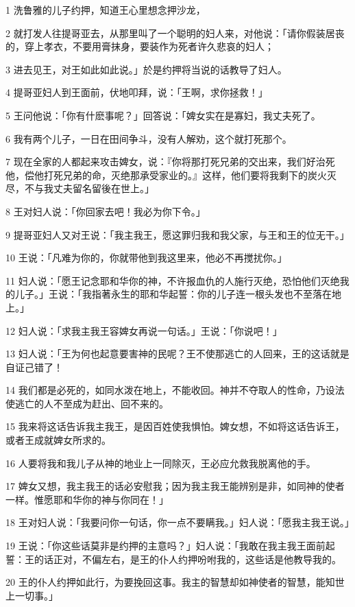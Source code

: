\par 1 洗鲁雅的儿子约押，知道王心里想念押沙龙，
\par 2 就打发人往提哥亚去，从那里叫了一个聪明的妇人来，对他说：「请你假装居丧的，穿上孝衣，不要用膏抹身，要装作为死者许久悲哀的妇人；
\par 3 进去见王，对王如此如此说。」於是约押将当说的话教导了妇人。
\par 4 提哥亚妇人到王面前，伏地叩拜，说：「王啊，求你拯救！」
\par 5 王问他说：「你有什麽事呢？」回答说：「婢女实在是寡妇，我丈夫死了。
\par 6 我有两个儿子，一日在田间争斗，没有人解劝，这个就打死那个。
\par 7 现在全家的人都起来攻击婢女，说：『你将那打死兄弟的交出来，我们好治死他，偿他打死兄弟的命，灭绝那承受家业的。』这样，他们要将我剩下的炭火灭尽，不与我丈夫留名留後在世上。」
\par 8 王对妇人说：「你回家去吧！我必为你下令。」
\par 9 提哥亚妇人又对王说：「我主我王，愿这罪归我和我父家，与王和王的位无干。」
\par 10 王说：「凡难为你的，你就带他到我这里来，他必不再搅扰你。」
\par 11 妇人说：「愿王记念耶和华你的神，不许报血仇的人施行灭绝，恐怕他们灭绝我的儿子。」王说：「我指著永生的耶和华起誓：你的儿子连一根头发也不至落在地上。」
\par 12 妇人说：「求我主我王容婢女再说一句话。」王说：「你说吧！」
\par 13 妇人说：「王为何也起意要害神的民呢？王不使那逃亡的人回来，王的这话就是自证己错了！
\par 14 我们都是必死的，如同水泼在地上，不能收回。神并不夺取人的性命，乃设法使逃亡的人不至成为赶出、回不来的。
\par 15 我来将这话告诉我主我王，是因百姓使我惧怕。婢女想，不如将这话告诉王，或者王成就婢女所求的。
\par 16 人要将我和我儿子从神的地业上一同除灭，王必应允救我脱离他的手。
\par 17 婢女又想，我主我王的话必安慰我；因为我主我王能辨别是非，如同神的使者一样。惟愿耶和华你的神与你同在！」
\par 18 王对妇人说：「我要问你一句话，你一点不要瞒我。」妇人说：「愿我主我王说。」
\par 19 王说：「你这些话莫非是约押的主意吗？」妇人说：「我敢在我主我王面前起誓：王的话正对，不偏左右，是王的仆人约押吩咐我的，这些话是他教导我的。
\par 20 王的仆人约押如此行，为要挽回这事。我主的智慧却如神使者的智慧，能知世上一切事。」
